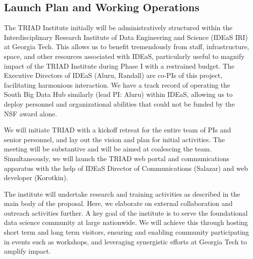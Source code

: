 \documentclass[12pt]{article}
\begin{document}
\vspace{-.1in}
\subsection{Launch Plan and Working Operations}
\label{sec:woperations}
\vspace{-.1in}
The TRIAD Institute initially will be administratively structured within the Interdisciplinary Research Institute of Data Engineering and Science (IDEaS IRI) at Georgia Tech. This allows us to benefit tremendously from staff, infrastructure, space, and other resources associated with IDEaS, particularly useful to magnify impact of the TRIAD Institute during Phase I with a restrained budget. The Executive Directors of IDEaS (Aluru, Randall) are co-PIs of this project, facilitating harmonious interaction. We  have a track record of operating the South Big Data Hub similarly (lead PI: Aluru) within IDEaS, allowing us to deploy personnel and organizational abilities that could not be funded by the NSF award alone.

 We will initiate TRIAD with a kickoff retreat for the entire team of PIs and senior personnel, and lay out the vision and plan for initial activities. The meeting will be substantive and will be aimed at coalescing the team. Simultaneously, we will launch the TRIAD web portal and communications apparatus with the help of IDEaS Director of Communications (Salazar) and web developer (Korotkin).

 The institute will undertake research and training activities as described in the main body of the proposal. Here, we elaborate on external collaboration and outreach activities further. A key goal of the institute is to serve the foundational data science community at large nationwide. We will achieve this through hosting short term and long term visitors, ensuring and enabling community participating in events such as workshops, and leveraging synergistic efforts at Georgia Tech to amplify impact.
\end{document}
